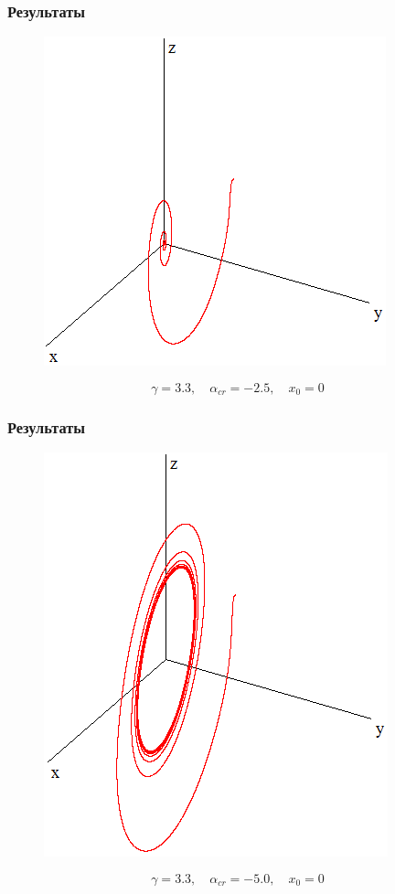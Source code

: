 \documentclass[fullscreen=true, unicode, bookmarks=false]{beamer}
\begin{document}
\begin{frame}

\frametitle{Результаты} 

\begin{figure}
\includegraphics[scale=0.55]{AHBbefore.png} 
\end{figure}
{\footnotesize $$ \gamma = 3.3, \quad \alpha_{cr} = -2.5, \quad x_0 = 0 $$}

\end{frame}

\begin{frame}

\frametitle{Результаты} 

\begin{figure}
\includegraphics[scale=0.55]{AHBafter.png} 
\end{figure}
{\footnotesize $$ \gamma = 3.3, \quad \alpha_{cr} = -5.0, \quad x_0 = 0 $$}

\end{frame}
\end{document}
